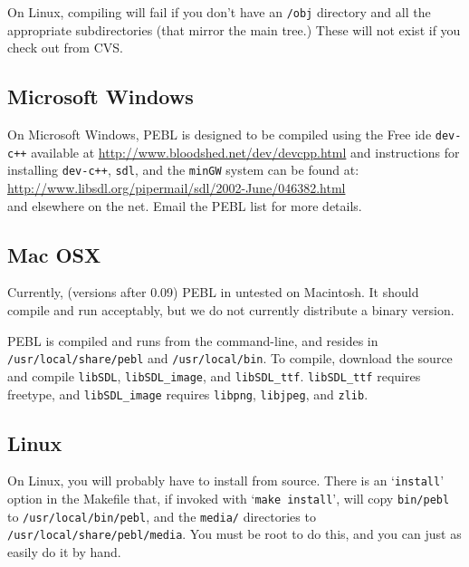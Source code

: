 On Linux, compiling will fail if you don't have an \texttt{/obj}
directory and all the appropriate subdirectories (that mirror the main
tree.)  These will not exist if you check out from CVS.

\subsection{Microsoft Windows}

On Microsoft Windows, PEBL is designed to be compiled using the Free
ide \texttt{dev-c++} available at
\href{http://www.bloodshed.net/dev/devcpp.html}{http://www.bloodshed.net/dev/devcpp.html}
and instructions for installing \texttt{dev-c++}, \texttt{sdl}, and
the \texttt{minGW} system can be found at:\\

\href{http://www.libsdl.org/pipermail/sdl/2002-June/046382.html}{http://www.libsdl.org/pipermail/sdl/2002-June/046382.html}\\

and elsewhere on the net.  Email the PEBL list for more details.

\subsection{Mac OSX}

Currently, (versions after 0.09) PEBL in untested on Macintosh.  It
should compile and run acceptably, but we do not currently distribute
a binary version. 

PEBL is compiled
and runs from the command-line, and resides in
\texttt{/usr/local/share/pebl} and \texttt{/usr/local/bin}.  To
compile, download the source and compile \texttt{libSDL},
\texttt{libSDL\_image}, and \texttt{libSDL\_ttf}.
\texttt{libSDL\_ttf} requires freetype, and \texttt{libSDL\_image}
requires \texttt{libpng}, \texttt{libjpeg}, and \texttt{zlib}.



\subsection{Linux}

On Linux, you will probably have to install from source.
There is an `\texttt{install}' option in the Makefile that, if invoked with
`\texttt{make install}', will copy \texttt{bin/pebl} to \texttt{/usr/local/bin/pebl}, and the
\texttt{media/} directories to \texttt{/usr/local/share/pebl/media}.  You must be root
to do this, and you can just as easily do it by hand.

